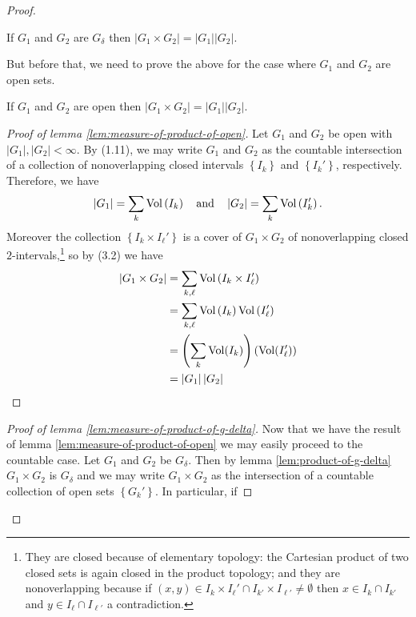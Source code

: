 \begin{proof}
\begin{lemma}
\label{lem:measure-of-product-of-g-delta}
If $G_1$ and $G_2$ are $G_\delta$ then $\left|G_1\times
  G_2\right|=\left|G_1\right|\left|G_2\right|$.
\end{lemma}
But before that, we need to prove the above for the case where $G_1$ and
$G_2$ are open sets.

\begin{lemma}
\label{lem:measure-of-product-of-open}
If $G_1$ and $G_2$ are open then $\left|G_1\times
  G_2\right|=\left|G_1\right|\left|G_2\right|$.
\end{lemma}
\begin{proof}[Proof of lemma \ref{lem:measure-of-product-of-open}]
\renewcommand\qedsymbol{$\clubsuit$}
Let $G_1$ and $G_2$ be open with
$\left|G_1\right|,\left|G_2\right|<\infty$. By (1.11), we may write $G_1$
and $G_2$ as the countable intersection of a collection of nonoverlapping
closed intervals $\left\{I_k\right\}$ and $\left\{I_k'\right\}$,
respectively. Therefore, we have
\[
\left|G_1\right|=\sum_k\operatorname{Vol}\left(I_k\right)\quad\text{and}\quad
\left|G_2\right|=\sum_k\operatorname{Vol}\left(I_k'\right).
\]
Moreover the collection $\left\{I_k\times I_\ell'\right\}$ is a cover of
$G_1\times G_2$ of nonoverlapping closed $2$-intervals,\footnote{They are closed
  because of elementary topology: the Cartesian product of two closed sets
  is again closed in the product topology; and they are nonoverlapping
  because if $(x,y)\in I_k\times I_\ell'\cap I_{k'}\times
  I_{\ell'}\neq\emptyset$ then $x\in I_k\cap I_{k'}$ and $y\in I_\ell\cap
  I_{\ell'}$ a contradiction.} so by (3.2) we have
\begin{align*}
\left|G_1\times G_2\right|
&=\sum_{k,\ell}\operatorname{Vol}\left(I_k\times I_\ell'\right)\\
&=\sum_{k,\ell}\operatorname{Vol}\left(I_k\right)\operatorname{Vol}\left(I_\ell'\right)\\
&=\left(\sum_k\operatorname{Vol}(I_k)\right)\left(\operatorname{Vol}(I_\ell')\right)\\
&=\left|G_1\right|\left|G_2\right|
\end{align*}
\end{proof}
\begin{proof}[Proof of lemma \ref{lem:measure-of-product-of-g-delta}]
\renewcommand\qedsymbol{$\clubsuit$}
Now that we have the result of lemma \ref{lem:measure-of-product-of-open}
we may easily proceed to the countable case. Let $G_1$ and $G_2$ be
$G_\delta$. Then by lemma \ref{lem:product-of-g-delta} $G_1\times G_2$ is
$G_\delta$ and we may write $G_1\times G_2$ as the intersection of a
countable collection of open sets $\left\{G_k'\right\}$. In particular, if

\end{proof}
\end{proof}
